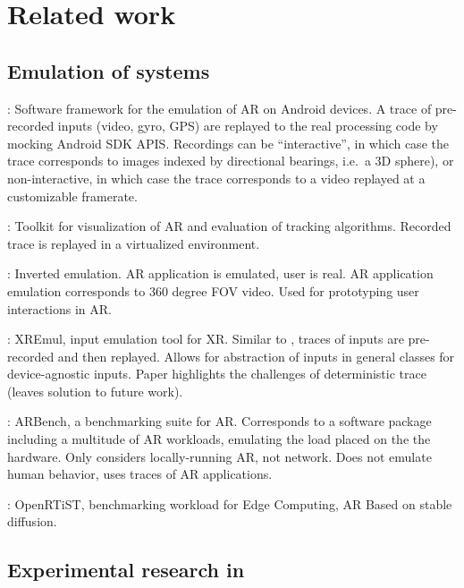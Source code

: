 \section{Related work}

\subsection{Emulation of  systems}


\textcite{munro2016aaremu}: Software framework for the emulation of AR on Android devices.
A trace of pre-recorded inputs (video, gyro, GPS) are replayed to the real processing code by mocking Android SDK APIS.
Recordings can be ``interactive'', in which case the trace corresponds to images indexed by directional bearings, i.e.\ a 3D sphere), or non-interactive, in which case the trace corresponds to a video replayed at a customizable framerate.

\textcite{williams2013transform}: Toolkit for visualization of AR and evaluation of tracking algorithms.
Recorded trace is replayed in a virtualized environment.


\textcite{berning2013parnorama}: Inverted emulation.
AR application is emulated, user is real.
AR application emulation corresponds to 360 degree FOV video.
Used for prototyping user interactions in AR.

\textcite{choi2022emulating}: XREmul, input emulation tool for XR.
Similar to \cite{munro2016aaremu}, traces of inputs are pre-recorded and then replayed.
Allows for abstraction of inputs in general classes for device-agnostic inputs.
Paper highlights the challenges of deterministic trace (leaves solution to future work).

\textcite{chetoui2022arbench}: ARBench, a benchmarking suite for AR.
Corresponds to a software package including a multitude of AR workloads, emulating the load placed on the the hardware.
Only considers locally-running AR, not network.
Does not emulate human behavior, uses traces of AR applications.

\textcite{george2020openrtist}: OpenRTiST, benchmarking workload for Edge Computing, AR
Based on stable diffusion. 


\subsection{Experimental research in }

